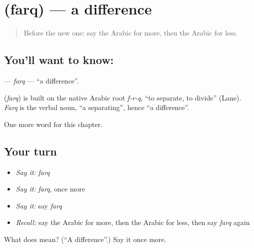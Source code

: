 \section[\texorpdfstring{\ar{فرق} (farq)}{فرق (farq)}]{ (farq) — a difference}

\label{lesson:AR-C176-farq}



\begin{quote}
Before the new one: say the Arabic for more, then the Arabic for less.
\end{quote}

\subsection*{You'll want to know: }
\textbf{} — \emph{farq} — \textquotedblleft{}a difference\textquotedblright{}.

\begin{cousinweb}
\textbf{} (\emph{farq}) is built on the native Arabic root \emph{f-r-q}, \textquotedblleft{}to separate, to divide\textquotedblright{} (Lane). \emph{Farq} is the verbal noun, \textquotedblleft{}a separating\textquotedblright{}, hence \textquotedblleft{}a difference\textquotedblright{}.
\end{cousinweb}

\begin{grammarlens}[title={What you've built}]
One more word for this chapter.
\end{grammarlens}

\subsection*{Your turn}
\begin{itemize}
\raggedright
  \item \emph{Say it:} \emph{farq}
  \item \emph{Say it:} \emph{farq}, once more
  \item \emph{Say it:} say \emph{farq}
  \item \emph{Recall:} say the Arabic for more, then the Arabic for less, then say \emph{farq} again
\end{itemize}

\begin{tcolorbox}[breakable,colback=teal!4,colframe=teal!35!black,title={Before you move on}]
What does  mean? (\textquotedblleft{}A difference\textquotedblright{}.) Say it once more.
\end{tcolorbox}
